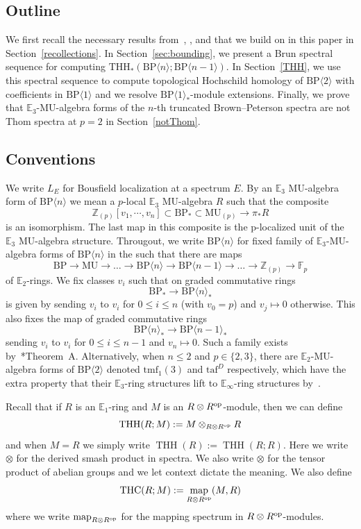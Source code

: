 \documentclass[11pt]{amsart}
\newcommand{\mr}[1]{\mathrm{#1}}
\newcommand{\bE}{\mathbb{E}}
\newcommand{\bF}{\mathbb{F}}
\newcommand{\bZ}{\mathbb{Z}}
\newcommand{\taf}{\mathrm{taf}}
\newcommand{\THC}{\mathrm{THC}}
\newcommand{\tmf}{\mathrm{tmf}}
\newcommand{\MU}{\mr{MU}}
\newcommand{\BP}{\mr{BP}}
\DeclareMathOperator{\map}{map}
\DeclareMathOperator{\THH}{THH}
\newcommand{\op}{\textup{op}}
\theoremstyle{definition}
\numberwithin{equation}{section}
\numberwithin{figure}{section}
\begin{document}
\subsection{Outline}
We first recall the necessary results from~\cite{AHL10}, \cite{AR05}, and \cite{ACH24} that we build on in this paper in Section~\ref{recollections}. In Section~\ref{sec:bounding}, we present a Brun spectral sequence for computing $\mathrm{THH}_*(\BP\langle n\rangle ;\BP\langle n-1\rangle)$. In Section~\ref{THH}, we use this spectral sequence to compute topological Hochschild homology of $\BP\langle 2\rangle$ with coefficients in $\BP\langle 1\rangle$ and we resolve  $\BP\langle 1\rangle_*$-module extensions. Finally, we prove that $\mathbb{E}_3$-$\MU$-algebra forms of the $n$-th truncated Brown--Peterson spectra are not Thom spectra at $p=2$ in Section~\ref{notThom}. 

\subsection{Conventions}
We write $L_{E}$ for Bousfield localization at a spectrum $E$. By an $
\mathbb{E}_{3}$ $\MU$-algebra form of $\BP\langle n\rangle$ we mean a $p$-local $\mathbb{E}_{3}$ $\MU$-algebra $R$ such that
the composite
\[ \mathbb{Z}_{(p)}[v_1,\cdots ,v_n]\subset \mathrm{BP}_*\subset \mathrm{MU}_{(p)}\to \pi_*R
\]
is an isomorphism. The last map in this composite is the p-localized unit of the $\mathbb{E}_3$ $\MU$-algebra
structure. Througout, we write $\BP\langle n\rangle$ for fixed family of $\bE_3$-$\MU$-algebra forms of $\BP\langle n\rangle$ in the such that there are maps
\[
\BP\to \MU \to  \dots \to \BP\langle n\rangle\to  \BP\langle n-1\rangle\to  \dots  \to \bZ_{(p)}\to \bF_{p}
\]
of $\bE_2$-rings. 
We fix classes $v_i$ such that on graded commutative rings
\[
\BP_*\to  \BP\langle n\rangle_*
\]
is given by sending $v_i$ to $v_i$ for $0\le i\le n$ (with $v_0=p$) and $v_j\mapsto 0$ otherwise. 
This also fixes the map of graded commutative rings 
\[  
    \BP\langle n\rangle_*\to  \BP\langle n-1\rangle_*
\]
sending $v_i$ to $v_i$ for $0\le i\le n-1$ and $v_n\mapsto 0$. Such a family exists by~\cite{HW22}*{Theorem~A}. 
Alternatively, when $n\le 2$ and $p\in \{2,3\}$, there are $\bE_2$-$\MU$-algebra forms of $\BP\langle 2\rangle$ denoted $\tmf_1(3)$ and $\taf^{D}$ respectively, which have the extra property that their $\bE_3$-ring structures lift to $\bE_\infty$-ring structures by~\cites{HL10,LN12,LN14,CM15}. 

Recall that if $R$ is an $\mathbb{E}_1$-ring and $M$ is an $R\otimes R^{\op}$-module, then we can define 
\[ 
\THH(R;M):=M\otimes_{R\otimes R^{\op}}R
\]
and when $M=R$ we simply write $\THH(R):=\THH(R;R)$. Here we write $\otimes$ for the derived smash product in spectra. We also write $\otimes$ for the tensor product of abelian groups and we let context dictate the meaning. We also define 
\[ 
\THC(R;M):=\map_{R\otimes R^{\op}}(M,R)
\]
where we write $\map_{R\otimes R^{\op}}$ for the mapping spectrum in $R\otimes R^{\op}$-modules. 
\end{document}
